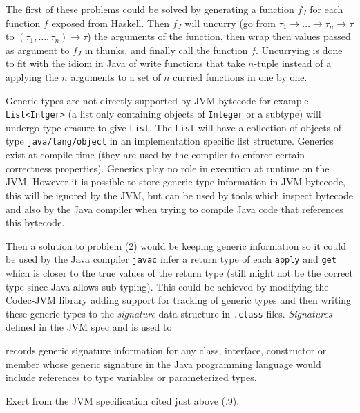 \documentclass[float=false, crop=false]{standalone}
\begin{document}
The first of these problems could be solved by generating a function $f_J$ for each 
function $f$ exposed from Haskell. Then $f_J$ will uncurry
(go from \mbox{$\tau_1 \rightarrow \dotsc \rightarrow \tau_n \rightarrow \tau$} to
\mbox{$(\tau_1,\dotsc,\tau_n) \rightarrow \tau$}) the arguments of the function, then 
wrap then values passed as argument to $f_J$ in thunks, and finally call the function $f$. 
Uncurrying is done to fit with the idiom in Java of write functions that take 
$n$-tuple instead of a applying the $n$ arguments to a set of $n$ curried functions
in one by one. 

Generic types are not directly supported by JVM bytecode for example
\verb|List<Intger>| (a list only containing objects of \verb|Integer| or a subtype)
will undergo type erasure to give \verb|List|. The \verb|List| 
will have a collection of objects of type \verb|java/lang/object| in an implementation
specific list structure. 
Generics exist at compile time (they are used by the compiler to enforce 
certain correctness properties). Generics play no role in execution at runtime
on the JVM. However it is possible to store generic type information
in JVM bytecode, this will be ignored by the JVM, but can be used by tools
which inspect bytecode and also by the Java compiler when trying to compile
Java code that references this bytecode.

Then a solution to problem (2) would be keeping generic information so it 
could be used by the Java compiler \texttt{javac} infer a return type of 
each \texttt{apply} and \texttt{get} which is closer to the true 
values of the return type (still might not be the correct type 
since Java allows sub-typing). 
This could be achieved by modifying the Codec-JVM library 
\cite{codec-jvm-link} adding support for tracking of generic types and then 
writing these generic types to the \textit{signature} data structure in 
\verb|.class| files. \textit{Signatures} defined in the JVM spec
\cite[.9]{jvm-spec8} and is used to 
\begin{displayquote}
  records generic signature information for any class, interface, 
  constructor or member whose generic signature in the Java 
  programming language would include references to type variables 
  or parameterized types.
\end{displayquote}
\begin{flushright}
Exert from the JVM specification cited just above (.9).
\end{flushright}
\end{document}
